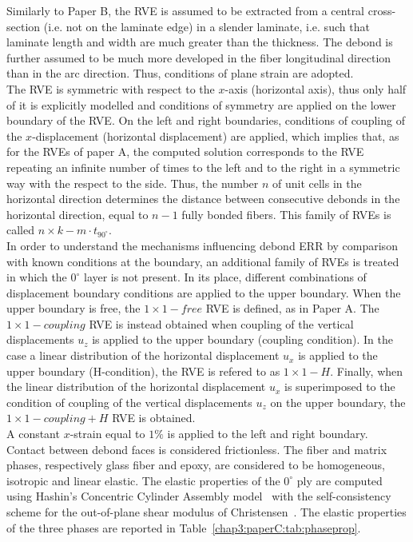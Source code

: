 Similarly to Paper B, the RVE is assumed to be extracted from a central cross-section (i.e. not on the laminate edge) in a slender laminate, i.e. such that laminate length and width are much greater than the thickness. The debond is further assumed to be much more developed in the fiber longitudinal direction than in the arc direction. Thus, conditions of plane strain are adopted.\\
The RVE is symmetric with respect to the $x$-axis (horizontal axis), thus only half of it is explicitly modelled and conditions of symmetry are applied on the lower boundary of the RVE. On the left and right boundaries, conditions of coupling of the $x$-displacement (horizontal displacement) are applied, which implies that, as for the RVEs of paper A, the computed solution corresponds to the RVE repeating an infinite number of times to the left and to the right in a symmetric way with the respect to the side. Thus, the number $n$ of unit cells in the horizontal direction determines the distance between consecutive debonds in the horizontal direction, equal to $n-1$ fully bonded fibers. This family of RVEs is called $n\times k-m\cdot t_{90^{\circ}}$.\\
In order to understand the mechanisms influencing debond ERR by comparison with known conditions at the boundary, an additional family of RVEs is treated in which the $0^{\circ}$ layer is not present. In its place, different combinations of displacement boundary conditions are applied to the upper boundary. When the upper boundary is free, the $1\times 1-free$ RVE is defined, as in Paper A. The $1\times 1-coupling$ RVE is instead obtained when coupling of the vertical displacements $u_{z}$ is applied to the upper boundary (coupling condition). In the case a linear distribution of the horizontal displacement $u_{x}$ is applied to the upper boundary (H-condition), the RVE is refered to as $1\times 1-H$. Finally, when the linear distribution of the horizontal displacement $u_{x}$ is superimposed to the condition of coupling of the vertical displacements $u_{z}$ on the upper boundary, the $1\times 1-coupling+H$ RVE is obtained.\\
A constant $x$-strain equal to $1\%$ is applied to the left and right boundary. Contact between debond faces is considered frictionless. The fiber and matrix phases, respectively glass fiber and epoxy, are considered to be homogeneous, isotropic and linear elastic. The elastic properties of the $0^{\circ}$ ply are computed using Hashin's Concentric Cylinder Assembly model~\cite{Hashin1983} with the self-consistency scheme for the out-of-plane shear modulus of Christensen~\cite{Christensen1979}. The elastic properties of the three phases are reported in Table~\ref{chap3:paperC:tab:phaseprop}.

